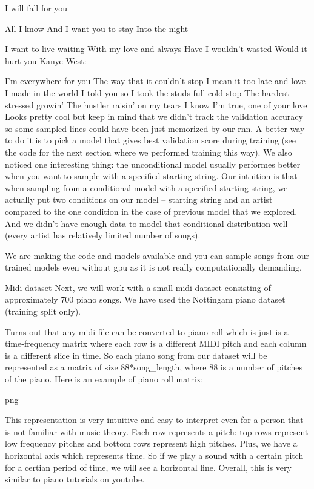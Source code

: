 \documentclass{article}
\begin{document}
I will fall for you  
  
All I know  
And I want you to stay  
Into the night  
  
I want to live waiting  
With my love and always  
Have I wouldn't wasted  
Would it hurt you
Kanye West:

I'm everywhere for you  
The way that it couldn't stop  
I mean it too late and love I made in the world  
I told you so I took the studs full cold-stop  
The hardest stressed growin'  
The hustler raisin' on my tears  
I know I'm true, one of your love
Looks pretty cool but keep in mind that we didn’t track the validation accuracy so some sampled lines could have been just memorized by our rnn. A better way to do it is to pick a model that gives best validation score during training (see the code for the next section where we performed training this way). We also noticed one interesting thing: the unconditional model usually performes better when you want to sample with a specified starting string. Our intuition is that when sampling from a conditional model with a specified starting string, we actually put two conditions on our model – starting string and an artist compared to the one condition in the case of previous model that we explored. And we didn’t have enough data to model that conditional distribution well (every artist has relatively limited number of songs).

We are making the code and models available and you can sample songs from our trained models even without gpu as it is not really computationally demanding.

Midi dataset
Next, we will work with a small midi dataset consisting of approximately 700 piano songs. We have used the Nottingam piano dataset (training split only).

Turns out that any midi file can be converted to piano roll which is just is a time-frequency matrix where each row is a different MIDI pitch and each column is a different slice in time. So each piano song from our dataset will be represented as a matrix of size 88*song\_length, where 88 is a number of pitches of the piano. Here is an example of piano roll matrix:

png

This representation is very intuitive and easy to interpret even for a person that is not familiar with music theory. Each row represents a pitch: top rows represent low frequency pitches and bottom rows represent high pitches. Plus, we have a horizontal axis which represents time. So if we play a sound with a certain pitch for a certian period of time, we will see a horizontal line. Overall, this is very similar to piano tutorials on youtube.\cite{DBLP:journals/mta/GuoLBGL18}
\end{document}
